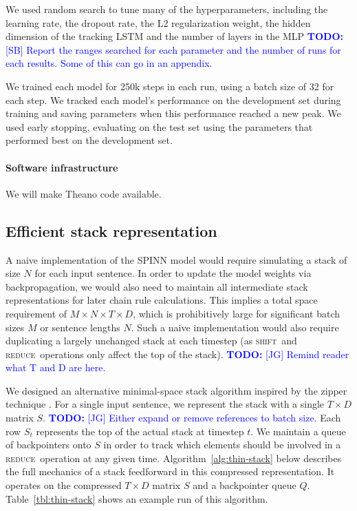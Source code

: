\documentclass[11pt]{article}
\newcommand\todo[1]{\textcolor{blue}{\textbf{TODO:} #1}}
\newcommand{\shift}{\textsc{shift}}
\newcommand{\reduce}{\textsc{reduce}}
\begin{document}
We used random search to tune many of the hyperparameters, including the learning rate, the dropout rate, the L2 regularization weight, the hidden dimension of the tracking LSTM and the number of layers in the MLP \todo{[SB] Report the ranges searched for each parameter and the number of runs for each results. Some of this can go in an appendix.}

We trained each model for 250k steps in each run, using a batch size of 32 for each step. We tracked each model's performance on the development set during training and saving parameters when this performance reached a new peak. We used early stopping, evaluating on the test set using the parameters that performed best on the development set.

\paragraph{Software infrastructure} We will make Theano code available.

\subsection{Efficient stack representation}

A naive implementation of the SPINN model would require simulating a stack of size $N$ for each input sentence. In order to update the model weights via backpropagation, we would also need to maintain all intermediate stack representations for later chain rule calculations. This implies a total space requirement of $M \times N \times T \times D$, which is prohibitively large for significant batch sizes $M$ or sentence lengths $N$. Such a naive implementation would also require duplicating a largely unchanged stack at each timestep (as \shift~and \reduce~operations only affect the top of the stack). \todo{[JG] Remind reader what T and D are here.}

We designed an alternative minimal-space stack algorithm inspired by the zipper technique \citep{huet1997zipper}. For a single input sentence, we represent the stack with a single $T \times D$ matrix $S$. \todo{[JG] Either expand or remove references to batch size.} Each row $S_t$ represents the top of the actual stack at timestep $t$. We maintain a queue of backpointers onto $S$ in order to track which elements should be involved in a \reduce~operation at any given time. Algorithm~\ref{alg:thin-stack} below describes the full mechanics of a stack feedforward in this compressed representation. It operates on the compressed $T \times D$ matrix $S$ and a backpointer queue $Q$. Table~\ref{tbl:thin-stack} shows an example run of this algorithm.
\end{document}
